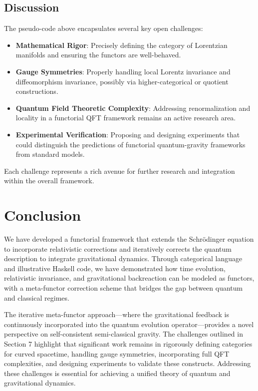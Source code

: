 \documentclass[12pt]{article}
\begin{document}
\subsection{Discussion}
The pseudo-code above encapsulates several key open challenges:
\begin{itemize}
    \item \textbf{Mathematical Rigor}: Precisely defining the category of Lorentzian manifolds and ensuring the functors are well-behaved.
    \item \textbf{Gauge Symmetries}: Properly handling local Lorentz invariance and diffeomorphism invariance, possibly via higher-categorical or quotient constructions.
    \item \textbf{Quantum Field Theoretic Complexity}: Addressing renormalization and locality in a functorial QFT framework remains an active research area.
    \item \textbf{Experimental Verification}: Proposing and designing experiments that could distinguish the predictions of functorial quantum-gravity frameworks from standard models.
\end{itemize}
Each challenge represents a rich avenue for further research and integration within the overall framework.

\section{Conclusion}
We have developed a functorial framework that extends the Schrödinger equation to incorporate relativistic corrections and iteratively corrects the quantum description to integrate gravitational dynamics. Through categorical language and illustrative Haskell code, we have demonstrated how time evolution, relativistic invariance, and gravitational backreaction can be modeled as functors, with a meta-functor correction scheme that bridges the gap between quantum and classical regimes.

The iterative meta-functor approach—where the gravitational feedback is continuously incorporated into the quantum evolution operator—provides a novel perspective on self-consistent semi-classical gravity. The challenges outlined in Section 7 highlight that significant work remains in rigorously defining categories for curved spacetime, handling gauge symmetries, incorporating full QFT complexities, and designing experiments to validate these constructs. Addressing these challenges is essential for achieving a unified theory of quantum and gravitational dynamics.
\end{document}
